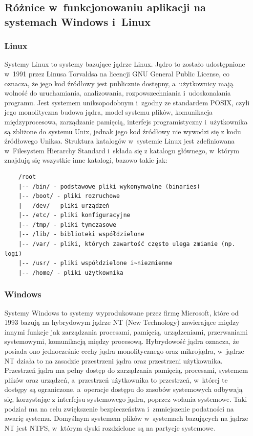 \subsection{Różnice w~funkcjonowaniu aplikacji na systemach Windows i~Linux}
\subsubsection{Linux}
Systemy Linux to systemy bazujące jądrze Linux. Jądro to zostało udostępnione w~1991 przez Linusa Torvaldsa na licencji GNU General Public License, co oznacza, że jego kod źródłowy jest publicznie dostępny, a~użytkownicy mają wolność do uruchamiania, analizowania, rozpowszechniania i~udoskonalania programu.
Jest systemem uniksopodobnym i~zgodny ze standardem POSIX, czyli jego monolityczna budowa jądra, model systemu plików, komunikacja międzyprocesowa, zarządzanie pamięcią, interfejs programistyczny i~użytkownika są zbliżone do systemu Unix, jednak jego kod źródłowy nie wywodzi się z kodu źródłowego Uniksa. Struktura katalogów w~systemie Linux jest zdefiniowana w~Filesystem Hierarchy Standard\cite{linuxFhs} i~składa się z katalogu głównego, w~którym znajdują się wszystkie inne katalogi, bazowo takie jak:
\begin{verbatim}
    /root
    |-- /bin/ - podstawowe pliki wykonynwalne (binaries)
    |-- /boot/ - pliki rozruchowe
    |-- /dev/ - pliki urządzeń
    |-- /etc/ - pliki konfiguracyjne
    |-- /tmp/ - pliki tymczasowe
    |-- /lib/ - biblioteki współdzielone
    |-- /var/ - pliki, których zawartość często ulega zmianie (np. logi)
    |-- /usr/ - pliki współdzielone i~niezmienne
    |-- /home/ - pliki użytkownika
\end{verbatim}

\subsubsection{Windows}
Systemy Windows to systemy wyprodukowane przez firmę Microsoft, które od 1993 bazują na hybrydowym jądrze\cite{windowsHybridKernel} NT (New Technology)\cite{windowsNT} zawierające między innymi funkcje jak zarządzania procesami, pamięcią, urządzeniami, przerwaniami systemowymi, komunikacją między procesową. Hybrydowość jądra oznacza, że posiada ono jednocześnie cechy jądra monolitycznego oraz mikrojądra, w~jądrze NT działa to na zasadzie przestrzeni jądra oraz przestrzeni użytkownika. Przestrzeń jądra ma pełny dostęp do zarządzania pamięcią, procesami, systemem plików oraz urządzeń, a~przestrzeń użytkownika to przestrzeń, w~której te dostępy są ograniczone, a~operacje dostępu do zasobów systemowych odbywają się, korzystając z interfejsu systemowego jądra, poprzez wołania systemowe. Taki podział ma na celu zwiększenie bezpieczeństwa i~zmniejszenie podatności na awarię systemu. Domyślnym systemem plików w~systemach bazujących na jądrze NT jest NTFS, w~którym dyski rozdzielone są na partycje systemowe.

